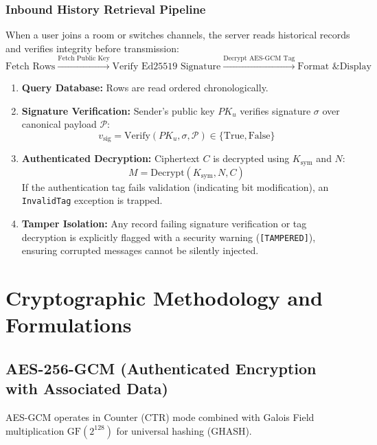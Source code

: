 \documentclass[11pt,a4paper]{article}
\begin{document}
\subsubsection{Inbound History Retrieval Pipeline}
When a user joins a room or switches channels, the server reads historical records and verifies integrity before transmission:
\begin{equation}
\text{Fetch Rows} \xrightarrow{\text{Fetch Public Key}} \text{Verify Ed25519 Signature} \xrightarrow{\text{Decrypt AES-GCM Tag}} \text{Format \& Display}
\end{equation}
\begin{enumerate}
    \item \textbf{Query Database:} Rows are read ordered chronologically.
    \item \textbf{Signature Verification:} Sender's public key $PK_u$ verifies signature $\sigma$ over canonical payload $\mathcal{P}$:
    \begin{equation}
    v_{\text{sig}} = \text{Verify}(PK_u, \sigma, \mathcal{P}) \in \{\text{True}, \text{False}\}
    \end{equation}
    \item \textbf{Authenticated Decryption:} Ciphertext $C$ is decrypted using $K_{\text{sym}}$ and $N$:
    \begin{equation}
    M = \text{Decrypt}(K_{\text{sym}}, N, C)
    \end{equation}
    If the authentication tag fails validation (indicating bit modification), an \texttt{InvalidTag} exception is trapped.
    \item \textbf{Tamper Isolation:} Any record failing signature verification or tag decryption is explicitly flagged with a security warning (\texttt{[TAMPERED]}), ensuring corrupted messages cannot be silently injected.
\end{enumerate}

\section{Cryptographic Methodology and Formulations}

\subsection{AES-256-GCM (Authenticated Encryption with Associated Data)}
AES-GCM operates in Counter (CTR) mode combined with Galois Field multiplication $\text{GF}(2^{128})$ for universal hashing (GHASH).
\end{document}
